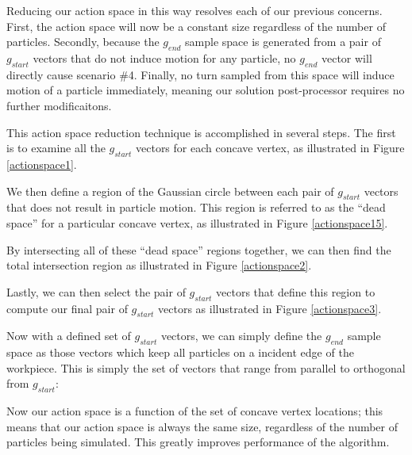 Reducing our action space in this way resolves each of our previous concerns. First, the action space will now be a constant size regardless of the number of particles. Secondly, because the $g_{end}$ sample space is generated from a pair of $g_{start}$ vectors that do not induce motion for any particle, no $g_{end}$ vector will directly cause scenario \#4. Finally, no turn sampled from this space will induce motion of a particle immediately, meaning our solution post-processor requires no further modificaitons.

This action space reduction technique is accomplished in several steps. The first is to examine all the $g_{start}$ vectors for each concave vertex, as illustrated in Figure \ref{actionspace1}.


We then define a region of the Gaussian circle between each pair of $g_{start}$ vectors that does not result in particle motion. This region is referred to as the ``dead space'' for a particular concave vertex, as illustrated in Figure \ref{actionspace15}.


By intersecting all of these ``dead space'' regions together, we can then find the total intersection region as illustrated in Figure \ref{actionspace2}.


Lastly, we can then select the pair of $g_{start}$ vectors that define this region to compute our final pair of $g_{start}$ vectors as illustrated in Figure \ref{actionspace3}.


Now with a defined set of $g_{start}$ vectors, we can simply define the $g_{end}$ sample space as those vectors which keep all particles on a incident edge of the workpiece. This is simply the set of vectors that range from parallel to orthogonal from $g_{start}$:


Now our action space is a function of the set of concave vertex locations; this means that our action space is always the same size, regardless of the number of particles being simulated. This greatly improves performance of the algorithm.

